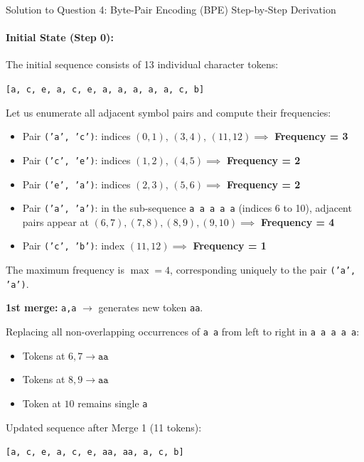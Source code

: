 \documentclass[11pt,a4paper]{article}
\begin{document}
\begin{solutionbox}{Solution to Question 4: Byte-Pair Encoding (BPE) Step-by-Step Derivation}
\paragraph{Initial State (Step 0):}
The initial sequence consists of 13 individual character tokens:
\begin{center}
\texttt{[a, c, e, a, c, e, a, a, a, a, a, c, b]}
\end{center}
Let us enumerate all adjacent symbol pairs and compute their frequencies:
\begin{itemize}[leftmargin=2em]
    \item Pair \texttt{('a', 'c')}: indices $(0,1)$, $(3,4)$, $(11,12) \implies$ \textbf{Frequency = 3}
    \item Pair \texttt{('c', 'e')}: indices $(1,2)$, $(4,5) \implies$ \textbf{Frequency = 2}
    \item Pair \texttt{('e', 'a')}: indices $(2,3)$, $(5,6) \implies$ \textbf{Frequency = 2}
    \item Pair \texttt{('a', 'a')}: in the sub-sequence \texttt{a a a a a} (indices 6 to 10), adjacent pairs appear at $(6,7), (7,8), (8,9), (9,10) \implies$ \textbf{Frequency = 4}
    \item Pair \texttt{('c', 'b')}: index $(11,12) \implies$ \textbf{Frequency = 1}
\end{itemize}
The maximum frequency is $\max = 4$, corresponding uniquely to the pair \texttt{('a', 'a')}.
\begin{takeawaybox}
\textbf{1st merge:} \texttt{a,a} $\longrightarrow$ generates new token \texttt{aa}.
\end{takeawaybox}
Replacing all non-overlapping occurrences of \texttt{a a} from left to right in \texttt{a a a a a}:
\begin{itemize}
    \item Tokens at $6, 7 \to \texttt{aa}$
    \item Tokens at $8, 9 \to \texttt{aa}$
    \item Token at $10$ remains single \texttt{a}
\end{itemize}
Updated sequence after Merge 1 (11 tokens):
\begin{center}
\texttt{[a, c, e, a, c, e, aa, aa, a, c, b]}
\end{center}


\end{solutionbox}
\end{document}

